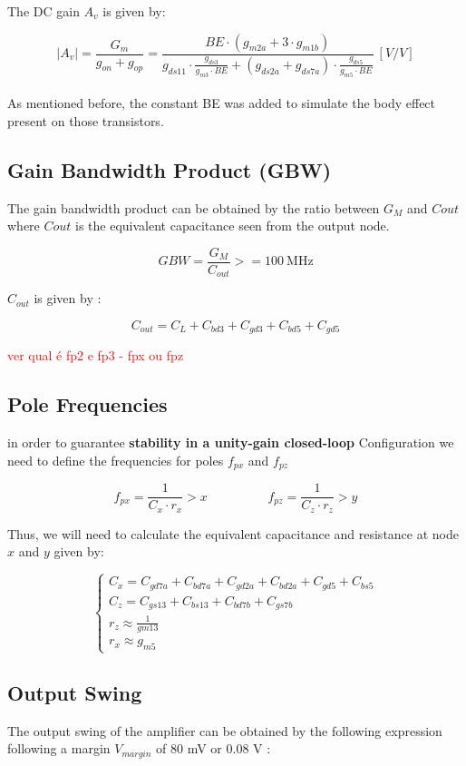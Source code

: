 The DC gain $A_v$ is given by:

$$|A_v| = \frac{G_m}{g_{on} + g_{op}} = \frac{BE \cdot (g_{m2a} + 3 \cdot g_{m1b})}{g_{ds11} \cdot \frac{g_{ds3}}{g_{m3}\cdot BE} + (g_{ds2a} + g_{ds7a}) \cdot \frac{g_{ds5}}{g_{m5} \cdot BE}} \ [V/V]$$ \\

As mentioned before, the constant BE was added to simulate the body effect present on those transistors.

\subsection{Gain Bandwidth Product (GBW)}
The gain bandwidth product can be obtained by the ratio between $G_M$ and $C{out}$ where $C{out}$ is the equivalent capacitance seen from the output node.

$$  GBW = \frac{G_M}{C_{out}} >= \SI{100}{\mega\hertz} $$

$C_{out}$ is given by :

$$C_{out} = C_L + C_{bd3} + C_{gd3} + C_{bd5} + C_{gd5}$$

\textcolor{red}{ver qual é fp2 e fp3 - fpx ou fpz }

\subsection{Pole Frequencies}
in order to guarantee \textbf{stability in a unity-gain closed-loop} Configuration we need to define the frequencies
for poles $f_{px}$ and  $f_{pz}$

$$f_{px} = \frac{1}{C_x\cdot r_x} > x  \hspace{2cm}  f_{pz} = \frac{1}{C_z\cdot r_z} > y$$

Thus, we will need to calculate the equivalent capacitance and resistance at node $x$ and $y$ given by:

\begin{equation}
    \begin{cases}
        C_x = C_{gd7a} + C_{bd7a}+ C_{gd2a} + C_{bd2a} + C_{gd5} + C_{bs5}\\
        C_z = C_{gs13} + C_{bs13} + C_{bd7b}+ C_{gs7b} \\
        r_z \approx \frac{1}{gm13} \\
        r_x \approx g_{m5} 
    \end{cases}
\end{equation}

\subsection{Output Swing}
The output swing of the amplifier can be obtained by the following expression following a margin $V_{margin}$ of 80 mV or 0.08 V :


